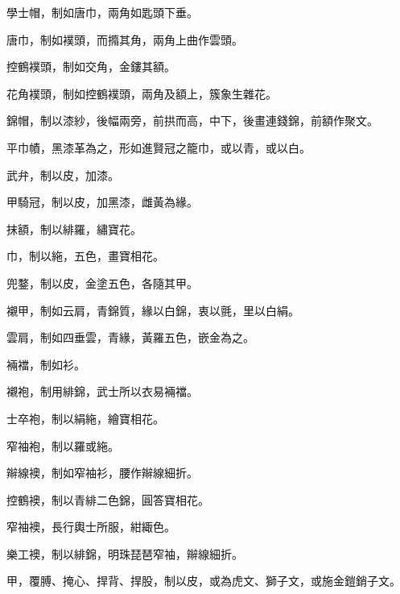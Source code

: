 \begin{pinyinscope}
 學士帽，制如唐巾，兩角如匙頭下垂。



 唐巾，制如襆頭，而撱其角，兩角上曲作雲頭。



 控鶴襆頭，制如交角，金鏤其額。



 花角襆頭，制如控鶴襆頭，兩角及額上，簇象生雜花。



 錦帽，制以漆紗，後幅兩旁，前拱而高，中下，後畫連錢錦，前額作聚文。



 平巾幘，黑漆革為之，形如進賢冠之籠巾，或以青，或以白。



 武弁，制以皮，加漆。



 甲騎冠，制以皮，加黑漆，雌黃為緣。



 抹額，制以緋羅，繡寶花。



 巾，制以絁，五色，畫寶相花。



 兜鍪，制以皮，金塗五色，各隨其甲。



 襯甲，制如云肩，青錦質，緣以白錦，衷以氈，里以白絹。



 雲肩，制如四垂雲，青緣，黃羅五色，嵌金為之。



 裲襠，制如衫。



 襯袍，制用緋錦，武士所以衣易裲襠。



 士卒袍，制以絹絁，繪寶相花。



 窄袖袍，制以羅或絁。



 辮線襖，制如窄袖衫，腰作辮線細折。



 控鶴襖，制以青緋二色錦，圓答寶相花。



 窄袖襖，長行輿士所服，紺緅色。



 樂工襖，制以緋錦，明珠琵琶窄袖，辮線細折。



 甲，覆膊、掩心、捍背、捍股，制以皮，或為虎文、獅子文，或施金鎧銷子文。




\end{pinyinscope}
